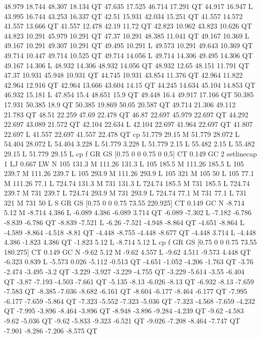 48.979 18.744 48.307 18.134 QT
47.635 17.525 46.714 17.291 QT
44.917 16.947 L
43.995 16.744 43.253 16.337 QT
42.51 15.931 42.034 15.251 QT
41.557 14.572 41.557 13.666 QT
41.557 12.478 42.19 11.72 QT
42.823 10.962 43.823 10.626 QT
44.823 10.291 45.979 10.291 QT
47.37 10.291 48.385 11.041 QT
49.167 10.369 L
49.167 10.291 49.307 10.291 QT
49.495 10.291 L
49.573 10.291 49.643 10.369 QT
49.714 10.447 49.714 10.525 QT
49.714 14.056 L
49.714 14.306 49.495 14.306 QT
49.167 14.306 L
48.932 14.306 48.932 14.056 QT
48.932 12.65 48.151 11.791 QT
47.37 10.931 45.948 10.931 QT
44.745 10.931 43.854 11.376 QT
42.964 11.822 42.964 12.916 QT
42.964 13.666 43.604 14.15 QT
44.245 14.634 45.104 14.853 QT
46.932 15.181 L
47.854 15.4 48.651 15.9 QT
49.448 16.4 49.917 17.166 QT
50.385 17.931 50.385 18.9 QT
50.385 19.869 50.05 20.587 QT
49.714 21.306 49.112 21.783 QT
48.51 22.259 47.69 22.478 QT
46.87 22.697 45.979 22.697 QT
44.292 22.697 43.089 21.572 QT
42.104 22.634 L
42.104 22.697 41.964 22.697 QT
41.807 22.697 L
41.557 22.697 41.557 22.478 QT
cp
51.779 29.15 M
51.779 28.072 L
54.404 28.072 L
54.404 3.228 L
51.779 3.228 L
51.779 2.15 L
55.482 2.15 L
55.482 29.15 L
51.779 29.15 L
cp
f
GR
GS
[0.75 0 0 0.75 0 0.5] CT
0.149 GC
2 setlinecap
1 LJ
0.667 LW
N
105 131.3 M
111.26 131.3 L
105 185.5 M
111.26 185.5 L
105 239.7 M
111.26 239.7 L
105 293.9 M
111.26 293.9 L
105 321 M
105 50 L
105 77.1 M
111.26 77.1 L
724.74 131.3 M
731 131.3 L
724.74 185.5 M
731 185.5 L
724.74 239.7 M
731 239.7 L
724.74 293.9 M
731 293.9 L
724.74 77.1 M
731 77.1 L
731 321 M
731 50 L
S
GR
GS
[0.75 0 0 0.75 73.55 220.925] CT
0.149 GC
N
-8.714 5.12 M
-8.714 4.386 L
-6.089 4.386 -6.089 3.714 QT
-6.089 -7.302 L
-7.182 -6.786 -8.839 -6.786 QT
-8.839 -7.521 L
-6.26 -7.521 -4.948 -8.864 QT
-4.651 -8.864 L
-4.589 -8.864 -4.518 -8.81 QT
-4.448 -8.755 -4.448 -8.677 QT
-4.448 3.714 L
-4.448 4.386 -1.823 4.386 QT
-1.823 5.12 L
-8.714 5.12 L
cp
f
GR
GS
[0.75 0 0 0.75 73.55 180.275] CT
0.149 GC
N
-9.62 5.12 M
-9.62 4.557 L
-9.62 4.511 -9.573 4.448 QT
-6.323 0.839 L
-5.573 0.026 -5.112 -0.513 QT
-4.651 -1.052 -4.206 -1.763 QT
-3.76 -2.474 -3.495 -3.2 QT
-3.229 -3.927 -3.229 -4.755 QT
-3.229 -5.614 -3.55 -6.404 QT
-3.87 -7.193 -4.503 -7.661 QT
-5.135 -8.13 -6.026 -8.13 QT
-6.932 -8.13 -7.659 -7.583 QT
-8.385 -7.036 -8.682 -6.161 QT
-8.604 -6.177 -8.464 -6.177 QT
-7.995 -6.177 -7.659 -5.864 QT
-7.323 -5.552 -7.323 -5.036 QT
-7.323 -4.568 -7.659 -4.232 QT
-7.995 -3.896 -8.464 -3.896 QT
-8.948 -3.896 -9.284 -4.239 QT
-9.62 -4.583 -9.62 -5.036 QT
-9.62 -5.833 -9.323 -6.521 QT
-9.026 -7.208 -8.464 -7.747 QT
-7.901 -8.286 -7.206 -8.575 QT
